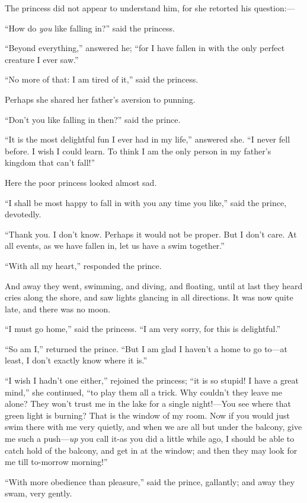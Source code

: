 \documentclass[12pt]{memoir}
\begin{document}
The princess did not appear to understand him, for she retorted his
question:---

``How do \emph{you} like falling in?'' said the princess.

``Beyond everything,'' answered he; ``for I have fallen in with the
only perfect creature I ever saw.''

``No more of that: I am tired of it,'' said the princess.

Perhaps she shared her father's aversion to punning.

``Don't you like falling in then?'' said the prince.

``It is the most delightful fun I ever had in my life,'' answered she.
``I never fell before.  I wish I could learn.  To think I am the only
person in my father's kingdom that can't fall!''

Here the poor princess looked almost sad.

``I shall be most happy to fall in with you any time you like,'' said
the prince, devotedly.

``Thank you.  I don't know.  Perhaps it would not be proper.  But I
don't care.  At all events, as we have fallen in, let us have a swim
together.''

``With all my heart,'' responded the prince.

And away they went, swimming, and diving, and floating, until at last
they heard cries along the shore, and saw lights glancing in all
directions.  It was now quite late, and there was no moon.

``I must go home,'' said the princess.  ``I am very sorry, for this is
delightful.''

``So am I,'' returned the prince.  ``But I am glad I haven't a home to
go to---at least, I don't exactly know where it is.''

``I wish I hadn't one either,'' rejoined the princess; ``it is so
stupid!  I have a great mind,'' she continued, ``to play them all a
trick.  Why couldn't they leave me alone?  They won't trust me in the
lake for a single night!---You see where that green light is burning?
That is the window of my room.  Now if you would just swim there with
me very quietly, and when we are all but under the balcony, give me
such a push---\emph{up} you call it-as you did a little while ago, I
should be able to catch hold of the balcony, and get in at the window;
and then they may look for me till to-morrow morning!''

``With more obedience than pleasure,'' said the prince, gallantly; and
away they swam, very gently.
\end{document}
